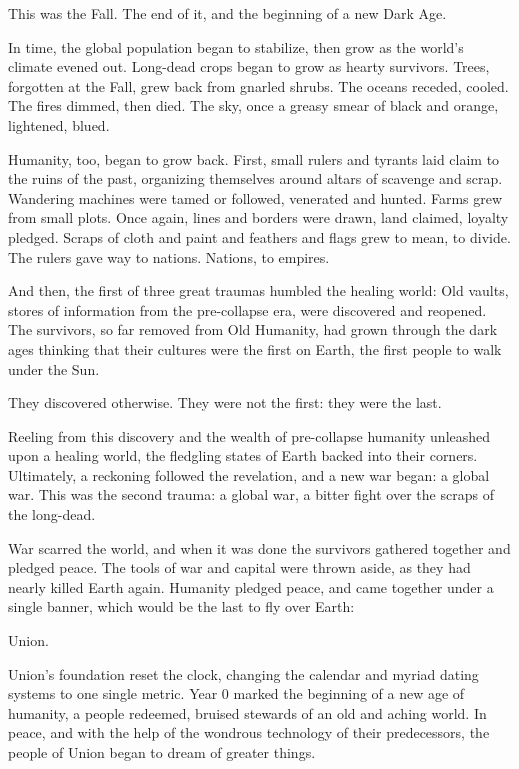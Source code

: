 This was the Fall. The end of it, and the beginning of a new Dark Age.

In time, the global population began to stabilize, then grow as the world’s climate evened out.
Long-dead crops began to grow as hearty survivors. Trees, forgotten at the Fall, grew back from
gnarled shrubs. The oceans receded, cooled. The fires dimmed, then died. The sky, once a
greasy smear of black and orange, lightened, blued.

Humanity, too, began to grow back. First, small rulers and tyrants laid claim to the ruins of the
past, organizing themselves around altars of scavenge and scrap. Wandering machines were
tamed or followed, venerated and hunted. Farms grew from small plots. Once again, lines and
borders were drawn, land claimed, loyalty pledged. Scraps of cloth and paint and feathers and
flags grew to mean, to divide. The rulers gave way to nations. Nations, to empires.

And then, the first of three great traumas humbled the healing world: Old vaults, stores of
information from the pre-collapse era, were discovered and reopened. The survivors, so far
removed from Old Humanity, had grown through the dark ages thinking that their cultures were
the first on Earth, the first people to walk under the Sun.

They discovered otherwise. They were not the first: they were the last.

Reeling from this discovery and the wealth of pre-collapse humanity unleashed upon a healing
world, the fledgling states of Earth backed into their corners. Ultimately, a reckoning followed the
revelation, and a new war began: a global war. This was the second trauma: a global war, a bitter
fight over the scraps of the long-dead.

War scarred the world, and when it was done the survivors gathered together and pledged
peace. The tools of war and capital were thrown aside, as they had nearly killed Earth again.
Humanity pledged peace, and came together under a single banner, which would be the last to
fly over Earth:

Union.

Union’s foundation reset the clock, changing the calendar and myriad dating systems to one
single metric. Year 0 marked the beginning of a new age of humanity, a people redeemed,
bruised stewards of an old and aching world. In peace, and with the help of the wondrous
technology of their predecessors, the people of Union began to dream of greater things.

